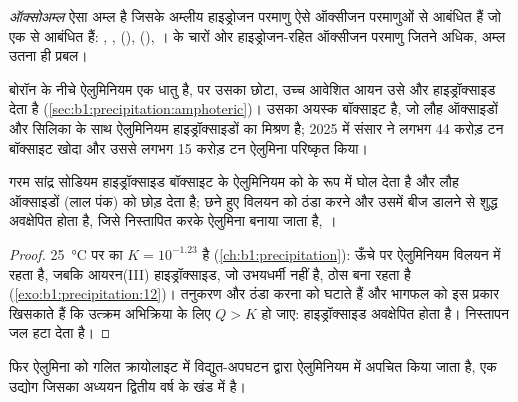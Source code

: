 \begin{definition}[ऑक्सोअम्ल]\label{def:b1:p-block-13-15:oxoacid}
\emph{ऑक्सोअम्ल} ऐसा अम्ल है जिसके अम्लीय हाइड्रोजन
परमाणु ऐसे ऑक्सीजन परमाणुओं से आबंधित हैं जो एक  से आबंधित हैं:
, ,  (), 
(), ।  के चारों ओर हाइड्रोजन-रहित ऑक्सीजन
परमाणु जितने अधिक, अम्ल उतना ही प्रबल।
\end{definition}

बोरॉन के नीचे ऐलुमिनियम एक धातु है, पर उसका छोटा, उच्च आवेशित आयन
उसे  और हाइड्रॉक्साइड देता है (\cref{sec:b1:precipitation:amphoteric})।
उसका अयस्क बॉक्साइट है, जो लौह ऑक्साइडों और सिलिका के साथ ऐलुमिनियम हाइड्रॉक्साइडों का
मिश्रण है; 2025 में संसार ने लगभग 44 करोड़ टन बॉक्साइट खोदा और
उससे लगभग 15 करोड़ टन ऐलुमिना परिष्कृत किया।

\begin{proposition}[बायर प्रक्रम]\label{prop:b1:p-block-13-15:bayer}
गरम सांद्र सोडियम हाइड्रॉक्साइड बॉक्साइट के ऐलुमिनियम को
 के रूप में घोल देता है और लौह ऑक्साइडों (लाल पंक) को छोड़ देता है; छने हुए विलयन को
ठंडा करने और उसमें बीज डालने से शुद्ध  अवक्षेपित होता है, जिसे निस्तापित करके ऐलुमिना बनाया जाता है,
।
\end{proposition}

\begin{proof}
\qty{25}{\celsius} पर  का $K = 10^{-1.23}$ है
(\cref{ch:b1:precipitation}): ऊँचे \ce{[OH-]} पर
ऐलुमिनियम विलयन में रहता है, जबकि आयरन(III) हाइड्रॉक्साइड, जो उभयधर्मी नहीं है,
ठोस बना रहता है (\cref{exo:b1:precipitation:12})। तनुकरण और ठंडा करना
\ce{[OH-]} को घटाते हैं और भागफल को इस प्रकार खिसकाते हैं कि उत्क्रम अभिक्रिया के लिए
$Q > K$ हो जाए: हाइड्रॉक्साइड अवक्षेपित होता है। निस्तापन जल हटा देता है।
\end{proof}

फिर ऐलुमिना को गलित क्रायोलाइट में विद्युत-अपघटन द्वारा ऐलुमिनियम में अपचित किया जाता है,
एक उद्योग जिसका अध्ययन द्वितीय वर्ष के खंड में है।

